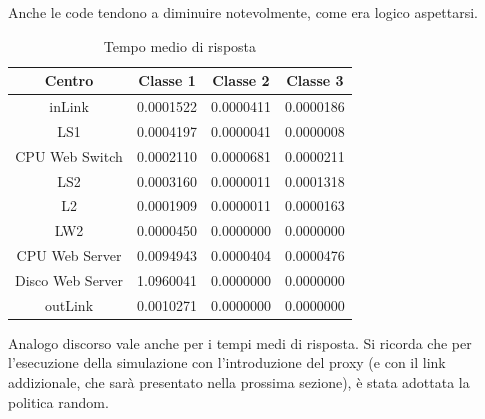 Anche le code tendono a diminuire notevolmente, come era logico aspettarsi. 
\begin{table}[htbp]
\begin{center}
\begin{tabular}{|c|c|c|c|}
\hline
Centro	&Classe 1	&Classe 2	&Classe 3\\
\hline
\hline
inLink & 0.0001522 & 0.0000411 & 0.0000186 \\ \hline
LS1 & 0.0004197 & 0.0000041 & 0.0000008 \\ \hline
CPU Web Switch & 0.0002110 & 0.0000681 & 0.0000211 \\ \hline
LS2 & 0.0003160 & 0.0000011 & 0.0001318 \\ \hline
L2 & 0.0001909 & 0.0000011 & 0.0000163 \\ \hline
LW2 & 0.0000450 & 0.0000000 & 0.0000000 \\ \hline
CPU Web Server & 0.0094943 & 0.0000404 & 0.0000476 \\ \hline
Disco Web Server & 1.0960041 & 0.0000000 & 0.0000000 \\ \hline
outLink & 0.0010271 & 0.0000000 & 0.0000000 \\ \hline
\end{tabular}
\end{center}
\caption{Tempo medio di risposta}
\label{tempomediodirisposta}
\end{table}
Analogo discorso vale anche per i tempi medi di risposta. Si ricorda che per l'esecuzione della simulazione con l'introduzione del proxy (e con il link addizionale, che sarà presentato nella prossima  sezione), è stata adottata la politica random.

